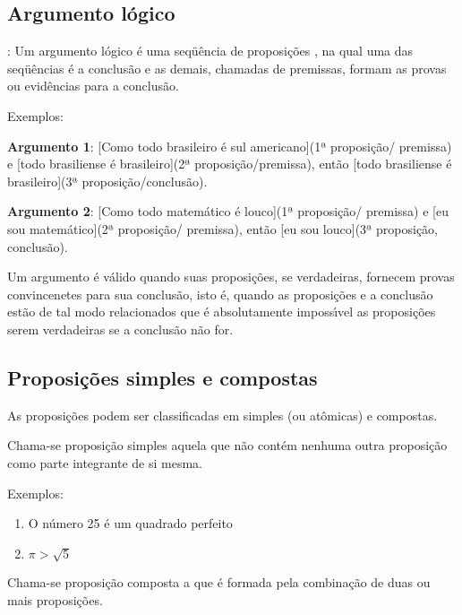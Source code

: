 \subsection{Argumento l{\'o}gico}
\begin{definicao}: Um argumento l{\'o}gico {\'e} uma seq{\"u}{\^e}ncia de proposi{\c c}{\~o}es , na qual uma das seq{\"u}{\^e}ncias {\'e} a conclus{\~a}o e as demais, chamadas de premissas, formam as provas ou evid{\^e}ncias para a conclus{\~a}o.\end{definicao}

Exemplos:

\textbf{Argumento 1}: [Como todo brasileiro {\'e} sul americano](1ª proposi{\c c}{\~a}o/ premissa) e [todo brasiliense {\'e} brasileiro](2ª proposi{\c c}{\~a}o/premissa), ent{\~a}o [todo brasiliense {\'e} brasileiro](3ª proposi{\c c}{\~a}o/conclus{\~a}o).

\textbf{Argumento 2}: [Como todo matem{\'a}tico {\'e} louco](1ª proposi{\c c}{\~a}o/ premissa) e [eu sou matem{\'a}tico](2ª proposi{\c c}{\~a}o/ premissa), ent{\~a}o [eu sou louco](3ª proposi{\c c}{\~a}o, conclus{\~a}o).

Um argumento {\'e} v{\'a}lido quando suas proposi{\c c}{\~o}es, se verdadeiras, fornecem provas convincenetes para sua conclus{\~a}o, isto {\'e}, quando as proposi{\c c}{\~o}es e a conclus{\~a}o est{\~a}o de tal modo relacionados que {\'e} absolutamente imposs{\'\i}vel as proposi{\c c}{\~o}es serem verdadeiras se a conclus{\~a}o n{\~a}o for.

\subsection{Proposi{\c c}{\~o}es simples e compostas}

As proposi{\c c}{\~o}es podem ser classificadas em simples (ou at{\^o}micas) e compostas.

Chama-se proposi{\c c}{\~a}o simples aquela que n{\~a}o cont{\'e}m nenhuma outra proposi{\c c}{\~a}o como parte integrante de si mesma.

Exemplos:
\begin{enumerate}
\item O n{\'u}mero 25 {\'e} um quadrado perfeito
\item $\pi>\sqrt{5}$
\end{enumerate}

Chama-se proposi{\c c}{\~a}o composta a que {\'e} formada pela combina{\c c}{\~a}o de duas ou mais proposi{\c c}{\~o}es.

